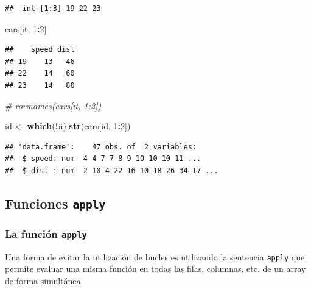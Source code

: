 \documentclass[]{book}
\newenvironment{Shaded}{\begin{snugshade}}{\end{snugshade}}
\newcommand{\KeywordTok}[1]{\textcolor[rgb]{0.13,0.29,0.53}{\textbf{#1}}}
\newcommand{\DecValTok}[1]{\textcolor[rgb]{0.00,0.00,0.81}{#1}}
\newcommand{\StringTok}[1]{\textcolor[rgb]{0.31,0.60,0.02}{#1}}
\newcommand{\CommentTok}[1]{\textcolor[rgb]{0.56,0.35,0.01}{\textit{#1}}}
\newcommand{\OperatorTok}[1]{\textcolor[rgb]{0.81,0.36,0.00}{\textbf{#1}}}
\newcommand{\NormalTok}[1]{#1}
\begin{document}
\begin{verbatim}
##  int [1:3] 19 22 23
\end{verbatim}

\begin{Shaded}
\begin{Highlighting}[]
\NormalTok{cars[it, }\DecValTok{1}\OperatorTok{:}\DecValTok{2}\NormalTok{]}
\end{Highlighting}
\end{Shaded}

\begin{verbatim}
##    speed dist
## 19    13   46
## 22    14   60
## 23    14   80
\end{verbatim}

\begin{Shaded}
\begin{Highlighting}[]
\CommentTok{# rownames(cars[it, 1:2])}

\NormalTok{id <-}\StringTok{ }\KeywordTok{which}\NormalTok{(}\OperatorTok{!}\NormalTok{ii)}
\KeywordTok{str}\NormalTok{(cars[id, }\DecValTok{1}\OperatorTok{:}\DecValTok{2}\NormalTok{])}
\end{Highlighting}
\end{Shaded}

\begin{verbatim}
## 'data.frame':    47 obs. of  2 variables:
##  $ speed: num  4 4 7 7 8 9 10 10 10 11 ...
##  $ dist : num  2 10 4 22 16 10 18 26 34 17 ...
\end{verbatim}

\begin{Shaded}
\end{Shaded}

\subsection{\texorpdfstring{Funciones
\texttt{apply}}{Funciones apply}}\label{funciones-apply}

\subsubsection{\texorpdfstring{La función
\texttt{apply}}{La función apply}}\label{la-funcion-apply}

Una forma de evitar la utilización de bucles es utilizando la sentencia
\texttt{apply} que permite evaluar una misma función en todas las filas,
columnas, etc. de un array de forma simultánea.
\end{document}
